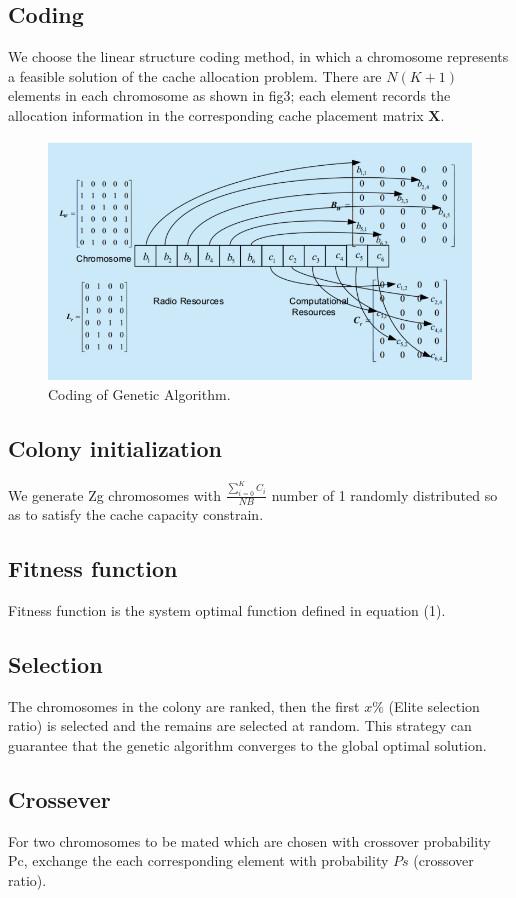 \documentclass[conference]{IEEEtran}
\begin{document}
\subsection{Coding}
We choose the linear structure coding method, in which a chromosome represents a feasible solution of the cache allocation problem. There are $N(K+1)$ elements in each chromosome as shown in fig3; each element records the allocation information in the corresponding cache placement matrix $\mathbf{X}$.
\begin{figure}[htbp]
 \centerline{\includegraphics[scale=0.5]{fig3.png}}
 \caption{Coding of Genetic Algorithm.}
 \label{fig 3}
\end{figure}

\subsection{Colony initialization}
We generate Zg chromosomes with $\frac{\sum_{i=0}^KC_i}{NB}$ number of 1 randomly distributed so as to satisfy the cache capacity constrain.
\subsection{Fitness function}
Fitness function is the system optimal function defined in equation (1).
\subsection{Selection}
The chromosomes in the colony are ranked, then the first $x\%$ (Elite selection ratio) is selected and the remains are selected at random. This strategy can guarantee that the genetic algorithm converges to the global optimal solution.
\subsection{Crossever}
For two chromosomes to be mated which are chosen with crossover probability Pc, exchange the each corresponding element with probability $Ps$ (crossover ratio).
\end{document}
